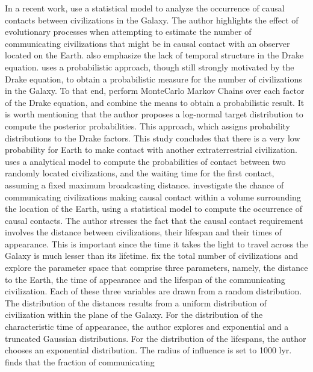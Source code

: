 In a recent work, \citep{balbi_impact_2018} use a statistical model to
analyze the occurrence of causal contacts between civilizations in the
Galaxy.
%
The author highlights the effect of evolutionary processes when
attempting to estimate the number of communicating civilizations that
might be in causal contact with an observer located on the Earth.
%
\citet{cirkovic_temporal_2004} also emphasize the lack of temporal
structure in the Drake equation.
%
\citet{bloetscher_using_2019} uses a probabilistic approach, though
still strongly motivated by the Drake equation, to obtain a
probabilistic measure for the number of civilizations in the Galaxy.
%
To that end, perform MonteCarlo Markov Chains over each factor of the
Drake equation, and combine the means to obtain a probabilistic
result.
%
It is worth mentioning that the author proposes a log-normal target
distribution to compute the posterior probabilities.
%
This approach, which assigns probability distributions to the Drake
factors.
%
This study concludes that there is a very low probability for Earth to
make contact with another extraterrestrial civilization.    
%
\citet{smith_broadcasting_2009} uses a analytical model to compute the
probabilities of contact between two randomly located civilizations,
and the waiting time for the first contact, assuming a fixed maximum
broadcasting distance.
% 
\citet{balbi_impact_2018} investigate the chance of communicating
civilizations making causal contact within a volume surrounding the
location of the Earth, using a statistical model to compute the
occurrence of causal contacts. The author stresses the fact that the
causal contact requirement involves the distance between
civilizations, their lifespan and their times of appearance.  This is
important since the time it takes the light to travel across the
Galaxy is much lesser than its lifetime.
%
\citet{balbi_impact_2018} fix the total number of civilizations and
explore the parameter space that comprise three parameters, namely,
the distance to the Earth, the time of appearance and the lifespan of
the communicating civilization.
%
Each of these three variables are drawn from a random distribution.
The distribution of the distances results from a uniform distribution
of civilization within the plane of the Galaxy.
%
For the distribution of the characteristic time of appearance, the
author explores and exponential and a truncated Gaussian
distributions. For the distribution of the lifespans, the author
chooses an exponential distribution.
%
The radius of influence is set to 1000 lyr.
%
\citet{balbi_impact_2018} finds that the fraction of communicating

